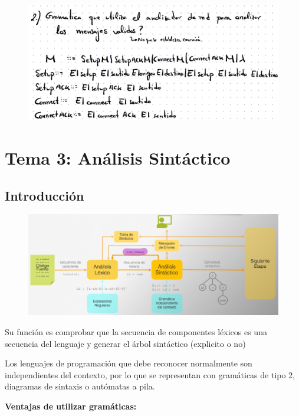 \documentclass[12pt, twoside, openright]{report} %
\begin{document}
\begin{figure}[H]
	{\includegraphics[scale=.3]{image-20210305192731385.png}}
\end{figure}

\chapter{Tema 3: Análisis Sintáctico}


\section{Introducción}

\begin{figure}[H]
	{\includegraphics[scale=.3]{image-20210312115053541.png}}
\end{figure}

Su función es comprobar que la secuencia de componentes léxicos es una
secuencia del lenguaje y generar el árbol sintáctico (explicito o no)

Los lenguajes de programación que debe reconocer normalmente son
independientes del contexto, por lo que se representan con gramáticas de
tipo 2, diagramas de sintaxis o autómatas a pila.

\textbf{Ventajas de utilizar gramáticas:}
\end{document}
